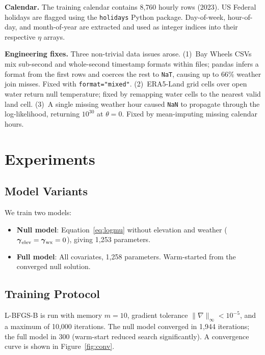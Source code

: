 \documentclass[conference,10pt]{IEEEtran}
\begin{document}
\textbf{Calendar.}
The training calendar contains 8{,}760 hourly rows (2023).  US Federal
holidays are flagged using the \texttt{holidays} Python package.
Day-of-week, hour-of-day, and month-of-year are extracted and used as
integer indices into their respective $\eta$ arrays.

\textbf{Engineering fixes.}
Three non-trivial data issues arose.
(1)~Bay Wheels CSVs mix sub-second and whole-second timestamp formats
within files; pandas infers a format from the first rows and coerces
the rest to \texttt{NaT}, causing up to 66\% weather join misses.
Fixed with \texttt{format="mixed"}.
(2)~ERA5-Land grid cells over open water return null temperature;
fixed by remapping water cells to the nearest valid land cell.
(3)~A single missing weather hour caused \texttt{NaN} to propagate
through the log-likelihood, returning $10^{30}$ at $\theta=0$.
Fixed by mean-imputing missing calendar hours.

\section{Experiments}

\subsection{Model Variants}

We train two models:
\begin{itemize}
  \item \textbf{Null model}: Equation~\eqref{eq:logmu} without
    elevation and weather ($\boldsymbol{\gamma}_{\rm elev}=
    \boldsymbol{\gamma}_{\rm wx}=0$), giving 1{,}253 parameters.
  \item \textbf{Full model}: All covariates, 1{,}258 parameters.
    Warm-started from the converged null solution.
\end{itemize}

\subsection{Training Protocol}

L-BFGS-B is run with memory $m=10$, gradient tolerance
$\|\nabla\|_\infty<10^{-5}$, and a maximum of 10{,}000 iterations.
The null model converged in 1{,}944 iterations; the full model in 300
(warm-start reduced search significantly).  A convergence curve is
shown in Figure~\ref{fig:conv}.
\end{document}
